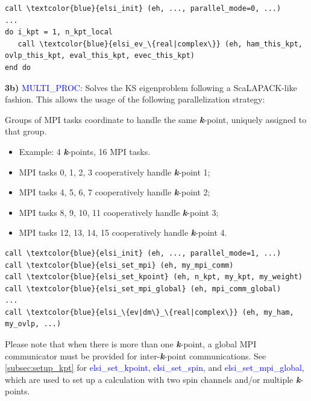 \documentclass{report}
\begin{document}
\begin{tcolorbox}
\begin{Verbatim}[commandchars=\\\{\}]
call \textcolor{blue}{elsi_init} (eh, ..., parallel_mode=0, ...)
...
do i_kpt = 1, n_kpt_local
   call \textcolor{blue}{elsi_ev_\{real|complex\}} (eh, ham_this_kpt, ovlp_this_kpt, eval_this_kpt, evec_this_kpt)
end do
\end{Verbatim}
\end{tcolorbox}

\textbf{3b)} \textcolor{blue}{MULTI\_PROC}:  Solves the KS eigenproblem following a ScaLAPACK-like fashion.  This allows the usage of the following parallelization strategy:

Groups of MPI tasks coordinate to handle the same \textbf{\textit{k}}-point, uniquely assigned to that group.
\begin{itemize}
\item Example:  4 \textbf{\textit{k}}-points, 16 MPI tasks.
\item MPI tasks 0, 1, 2, 3 cooperatively handle \textbf{\textit{k}}-point 1;
\item MPI tasks 4, 5, 6, 7 cooperatively handle \textbf{\textit{k}}-point 2;
\item MPI tasks 8, 9, 10, 11 cooperatively handle \textbf{\textit{k}}-point 3;
\item MPI tasks 12, 13, 14, 15 cooperatively handle \textbf{\textit{k}}-point 4.
\end{itemize}

\begin{tcolorbox}
\begin{Verbatim}[commandchars=\\\{\}]
call \textcolor{blue}{elsi_init} (eh, ..., parallel_mode=1, ...)
call \textcolor{blue}{elsi_set_mpi} (eh, my_mpi_comm)
call \textcolor{blue}{elsi_set_kpoint} (eh, n_kpt, my_kpt, my_weight)
call \textcolor{blue}{elsi_set_mpi_global} (eh, mpi_comm_global)
...
call \textcolor{blue}{elsi_\{ev|dm\}_\{real|complex\}} (eh, my_ham, my_ovlp, ...)
\end{Verbatim}
\end{tcolorbox}

Please note that when there is more than one \textbf{\textit{k}}-point, a global MPI communicator must be provided for inter-\textbf{\textit{k}}-point communications.  See \ref{subsec:setup_kpt} for \textcolor{blue}{elsi\_set\_kpoint}, \textcolor{blue}{elsi\_set\_spin}, and \textcolor{blue}{elsi\_set\_mpi\_global}, which are used to set up a calculation with two spin channels and/or multiple \textbf{\textit{k}}-points.
\end{document}
